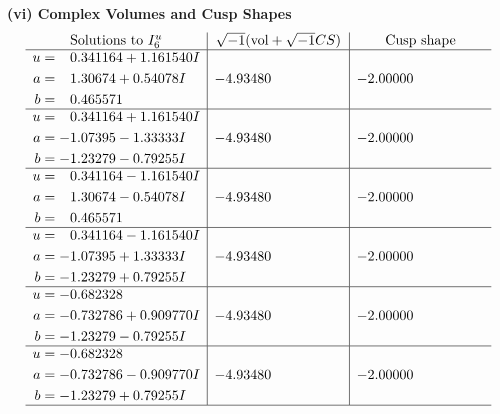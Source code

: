\documentclass[1p]{elsarticle_modified}
\theoremstyle{definition}
\newcommand{\I}{\sqrt{-1}}
\begin{document}
\newpage\flushleft \textbf{(vi) Complex Volumes and Cusp Shapes}
$$\begin{array}{c|c|c}  
\text{Solutions to }I^u_{6}& \I (\text{vol} + \sqrt{-1}CS) & \text{Cusp shape}\\
 \hline 
\begin{aligned}
u &= \phantom{-}0.341164 + 1.161540 I \\
a &= \phantom{-}1.30674 + 0.54078 I \\
b &= \phantom{-}0.465571\phantom{ +0.000000I}\end{aligned}
 & -4.93480\phantom{ +0.000000I} & -2.00000\phantom{ +0.000000I} \\ \hline\begin{aligned}
u &= \phantom{-}0.341164 + 1.161540 I \\
a &= -1.07395 - 1.33333 I \\
b &= -1.23279 - 0.79255 I\end{aligned}
 & -4.93480\phantom{ +0.000000I} & -2.00000\phantom{ +0.000000I} \\ \hline\begin{aligned}
u &= \phantom{-}0.341164 - 1.161540 I \\
a &= \phantom{-}1.30674 - 0.54078 I \\
b &= \phantom{-}0.465571\phantom{ +0.000000I}\end{aligned}
 & -4.93480\phantom{ +0.000000I} & -2.00000\phantom{ +0.000000I} \\ \hline\begin{aligned}
u &= \phantom{-}0.341164 - 1.161540 I \\
a &= -1.07395 + 1.33333 I \\
b &= -1.23279 + 0.79255 I\end{aligned}
 & -4.93480\phantom{ +0.000000I} & -2.00000\phantom{ +0.000000I} \\ \hline\begin{aligned}
u &= -0.682328\phantom{ +0.000000I} \\
a &= -0.732786 + 0.909770 I \\
b &= -1.23279 - 0.79255 I\end{aligned}
 & -4.93480\phantom{ +0.000000I} & -2.00000\phantom{ +0.000000I} \\ \hline\begin{aligned}
u &= -0.682328\phantom{ +0.000000I} \\
a &= -0.732786 - 0.909770 I \\
b &= -1.23279 + 0.79255 I\end{aligned}
 & -4.93480\phantom{ +0.000000I} & -2.00000\phantom{ +0.000000I}\\
 \hline 
 \end{array}$$\newpage
\end{document}
